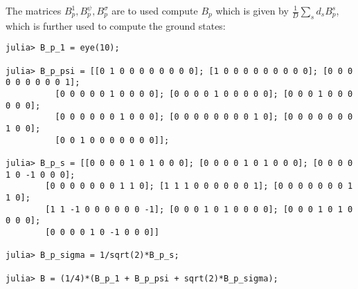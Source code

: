 The matrices $B_{p}^{1}, B_{p}^{\psi}, B_{p}^{\sigma}$ are to used compute $B_{p}$ which is given by $\frac{1}{D}\sum_{s}d_{s}B_{p}^{s}$, which is further 
used to compute the ground states:  \\
\begin{lstlisting}[frame=single]
julia> B_p_1 = eye(10);                                                                                                                                                                                                       
                                                                                                                                                                                                                              
julia> B_p_psi = [[0 1 0 0 0 0 0 0 0 0]; [1 0 0 0 0 0 0 0 0 0]; [0 0 0 0 0 0 0 0 0 1]; 
		  [0 0 0 0 0 1 0 0 0 0]; [0 0 0 0 1 0 0 0 0 0]; [0 0 0 1 0 0 0 0 0 0]; 
		  [0 0 0 0 0 0 1 0 0 0]; [0 0 0 0 0 0 0 0 1 0]; [0 0 0 0 0 0 0 1 0 0]; 
		  [0 0 1 0 0 0 0 0 0 0]];                                                                                                                                                                                                     
                                                                                                                                                                                                                              
julia> B_p_s = [[0 0 0 0 1 0 1 0 0 0]; [0 0 0 0 1 0 1 0 0 0]; [0 0 0 0 1 0 -1 0 0 0]; 
		[0 0 0 0 0 0 0 1 1 0]; [1 1 1 0 0 0 0 0 0 1]; [0 0 0 0 0 0 0 1 1 0]; 
		[1 1 -1 0 0 0 0 0 0 -1]; [0 0 0 1 0 1 0 0 0 0]; [0 0 0 1 0 1 0 0 0 0]; 
		[0 0 0 0 1 0 -1 0 0 0]]                                                                                                                                                                                                   

julia> B_p_sigma = 1/sqrt(2)*B_p_s;                                                                                                                                                                                          
                                                                                                                                                                                                                              
julia> B = (1/4)*(B_p_1 + B_p_psi + sqrt(2)*B_p_sigma);                                                                                                                                                                       
                                                                                                                                                                                                                              

\end{lstlisting}
